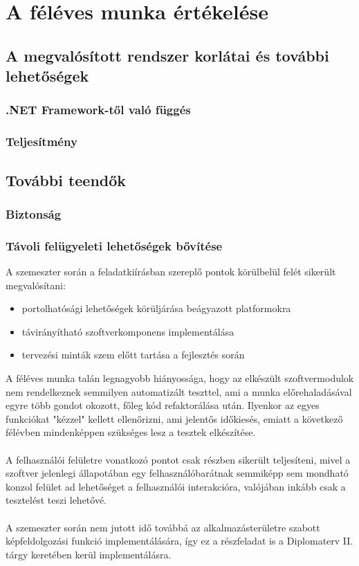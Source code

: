 \chapter{A féléves munka értékelése}

\section{A megvalósított rendszer korlátai és további lehetőségek}
\subsection{.NET Framework-től való függés}
\subsection{Teljesítmény}
\section{További teendők}
\subsection{Biztonság}
\subsection{Távoli felügyeleti lehetőségek bővítése}

A szemeszter során a feladatkiírásban szereplő pontok körülbelül felét sikerült megvalósítani:
\begin{itemize}
\item portolhatósági lehetőségek körüljárása beágyazott platformokra
\item távirányítható szoftverkomponens implementálása
\item tervezési minták szem előtt tartása a fejlesztés során
\end{itemize}

A féléves munka talán legnagyobb hiányossága, hogy az elkészült szoftvermodulok nem rendelkeznek semmilyen automatizált teszttel, ami a munka előrehaladásával egyre több gondot okozott, főleg kód refaktorálása után. Ilyenkor az egyes funkciókat "kézzel" kellett ellenőrizni, ami jelentős időkiesés, emiatt a következő félévben mindenképpen szükséges lesz a tesztek elkészítése. \\
\\
A felhasználói felületre vonatkozó pontot csak részben sikerült teljesíteni, mivel a szoftver jelenlegi állapotában egy felhasználóbarátnak semmiképp sem mondható konzol felület ad lehetőséget a felhasználói interakcióra, valójában inkább csak a tesztelést teszi lehetővé. \\
\\
A szemeszter során nem jutott idő továbbá az alkalmazásterületre szabott képfeldolgozási funkció implementálására, így ez a részfeladat is a Diplomaterv II. tárgy keretében kerül implementálásra.